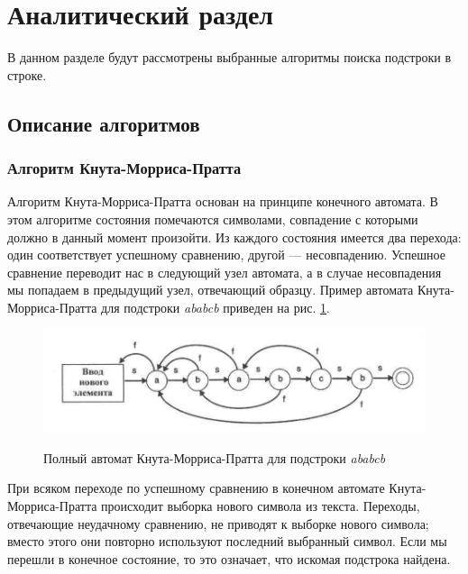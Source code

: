 \documentclass[a4paper,12pt]{article}
\begin{document}
\section{Аналитический раздел}

В данном разделе будут рассмотрены выбранные алгоритмы поиска подстроки в строке.

\subsection{Описание алгоритмов}

\subsubsection{Алгоритм Кнута-Морриса-Пратта}

Алгоритм Кнута-Морриса-Пратта основан на принципе конечного автомата.
В этом алгоритме состояния помечаются символами, совпадение с которыми должно в данный момент произойти.
Из каждого состояния имеется два перехода: один соответствует успешному сравнению, другой — несовпадению.
Успешное сравнение переводит нас в следующий узел автомата, а в случае несовпадения мы попадаем
в предыдущий узел, отвечающий образцу.
Пример автомата Кнута-Морриса-Пратта для подстроки \textit{ababcb} приведен на рис. \ref{fig:kmp_example}. ~\cite{mcconell}

\begin{figure}[h!]
	\begin{center}
		{\includegraphics[scale = 0.5]{kmp_example.png}}
		\caption{
			Полный автомат Кнута-Морриса-Пратта для подстроки \textit{ababcb}}
		\label{fig:kmp_example}
	\end{center}
\end{figure}

При всяком переходе по успешному сравнению в конечном автомате
Кнута-Морриса-Пратта происходит выборка нового символа из текста.
Переходы, отвечающие неудачному сравнению, не приводят к выборке нового символа;
вместо этого они повторно используют последний выбранный символ. Если мы перешли в конечное состояние,
то это означает, что искомая подстрока найдена.
\end{document}
